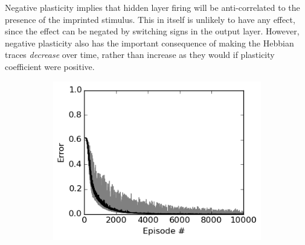 \documentclass{article}
\begin{document}
Negative plasticity implies that hidden layer firing will be anti-correlated to
the presence of the imprinted stimulus. This in itself is unlikely to have any
effect, since the effect can be negated by switching signs in the output layer.
However, negative plasticity also has the important consequence of making the
Hebbian traces \emph{decrease} over time, rather than increase as they would if
plasticity coefficient were positive. 

\begin{figure}
\noindent
\begin{subfigure}[t]{0.35\textwidth}
\noindent
\includegraphics[scale=0.5]{figResultsReversal.png}
\end{subfigure}
\begin{subfigure}[t]{0.4\textwidth}
\centering
{}
\end{subfigure}
\end{figure}
\end{document}
